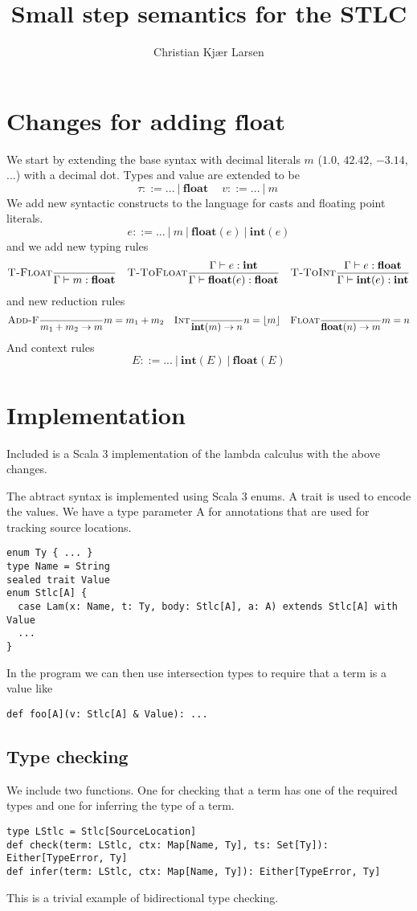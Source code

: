 \documentclass[11pt]{article}
\title{Small step semantics for the STLC}
\author{Christian Kjær Larsen}
\begin{document}
\maketitle
\section{Changes for adding $\mathbf{float}$}
We start by extending the base syntax with decimal literals $m$ ($1.0$, $42.42$, $-3.14$, ...) with a decimal dot. Types and value are extended to be
\[
    \tau ::= ... \ |\ \mathbf{float}\ \quad
    v ::= ... \ |\ m\
\]
We add new syntactic constructs to the language for casts and floating point literals.
\[
    e ::= ... \ |\ m \ |\ \mathbf{float}(e)\ |\ \mathbf{int}(e)
\]
and we add new typing rules
\[
    \textsc{T-Float}\frac{}{\Gamma \vdash m : \mathbf{float}} \quad
    \textsc{T-ToFloat}\frac{\Gamma \vdash e : \mathbf{int}}{\Gamma \vdash \mathbf{float}(e) : \mathbf{float}} \quad
    \textsc{T-ToInt}\frac{\Gamma \vdash e : \mathbf{float}}{\Gamma \vdash \mathbf{int}(e) : \mathbf{int}}
\]
and new reduction rules
\[
    \textsc{Add-F}\frac{}{m_1 + m_2 \rightarrow m}m = m_1 + m_2 \quad
    \textsc{Int}\frac{}{\mathbf{int}(m) \rightarrow n}n = \lfloor m \rfloor \quad
    \textsc{Float}\frac{}{\mathbf{float}(n) \rightarrow m}m = n
\]
And context rules
\[
    E ::= ...\ |\ \mathbf{int}(E) \ |\ \mathbf{float}(E)
\]
\section{Implementation}
Included is a Scala 3 implementation of the lambda calculus with the above changes.

The abtract syntax is implemented using Scala 3 enums. A trait is used to encode the values. We have a type parameter A for annotations that are used for tracking source locations.
\begin{lstlisting}
enum Ty { ... }
type Name = String
sealed trait Value
enum Stlc[A] {
  case Lam(x: Name, t: Ty, body: Stlc[A], a: A) extends Stlc[A] with Value
  ...
}
\end{lstlisting}
In the program we can then use intersection types to require that a term is a value like
\begin{lstlisting}
def foo[A](v: Stlc[A] & Value): ...
\end{lstlisting}
\subsection{Type checking}
We include two functions. One for checking that a term has one of the required types and one for inferring the type of a term.
\begin{lstlisting}
type LStlc = Stlc[SourceLocation]
def check(term: LStlc, ctx: Map[Name, Ty], ts: Set[Ty]): Either[TypeError, Ty]
def infer(term: LStlc, ctx: Map[Name, Ty]): Either[TypeError, Ty]
\end{lstlisting}
This is a trivial example of bidirectional type checking.
\end{document}
